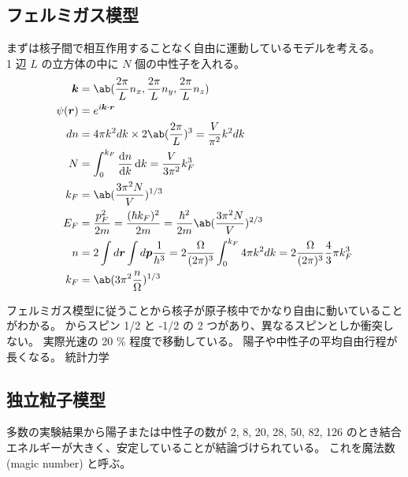 \documentclass[uplatex,dvipdfmx,a4paper,11pt]{jlreq}
\newcommand{\rr}{\bm{r}}
\newcommand{\kk}{\bm{k}}
\newcommand{\pp}{\bm{p}}
\numberwithin{equation}{section}
\theoremstyle{definition}
\begin{document}
\subsection{フェルミガス模型}
まずは核子間で相互作用することなく自由に運動しているモデルを考える。 \\

1 辺 $L$ の立方体の中に $N$ 個の中性子を入れる。
\begin{align}
  \bm{k}    & = \ab(\frac{2\pi}{L}n_x, \frac{2\pi}{L}n_y, \frac{2\pi}{L}n_z)                                                                       \\
  \psi(\rr) & = e^{i\kk\cdot\rr}                                                                                                                   \\
  dn        & = 4\pi k^2dk \times 2 \ab(\frac{2\pi}{L})^3 = \frac{V}{\pi^2}k^2dk                                                                   \\
  N         & = \int_0^{k_F}\diff{n}{k}\dl{k} = \frac{V}{3\pi^2}k_F^3                                                                              \\
  k_F       & = \ab(\frac{3\pi^2 N}{V})^{1/3}                                                                                                      \\
  E_F       & = \frac{p_F^2}{2m} = \frac{(\hbar k_F)^2}{2m} = \frac{\hbar^2}{2m}\ab(\frac{3\pi^2 N}{V})^{2/3}                                      \\
  n         & = 2\int d\rr \int d\pp \frac{1}{h^3} = 2\frac{\Omega}{(2\pi)^3}\int_0^{k_F}4\pi k^2dk = 2\frac{\Omega}{(2\pi)^3}\frac{4}{3}\pi k_F^3 \\
  k_F       & = \ab(3\pi^2\frac{n}{\Omega})^{1/3}
\end{align}

フェルミガス模型に従うことから核子が原子核中でかなり自由に動いていることがわかる。
からスピン 1/2 と -1/2 の 2 つがあり、異なるスピンとしか衝突しない。
実際光速の 20 \% 程度で移動している。
陽子や中性子の平均自由行程が長くなる。
統計力学



\subsection{独立粒子模型}
多数の実験結果から陽子または中性子の数が 2, 8, 20, 28, 50, 82, 126 のとき結合エネルギーが大きく、安定していることが結論づけられている。
これを魔法数 (magic number) と呼ぶ。
\end{document}
